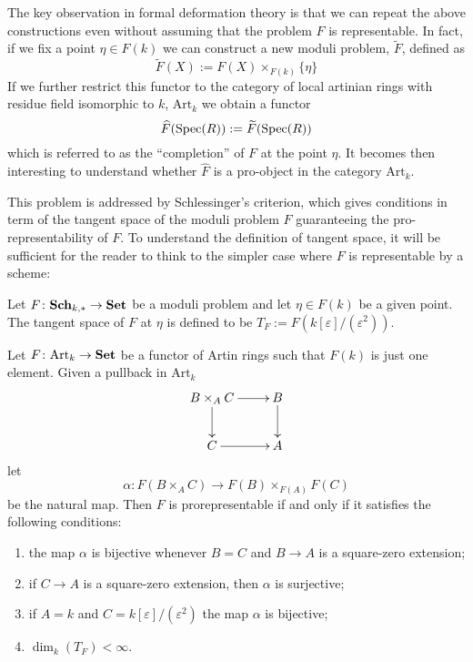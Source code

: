 \begin{refsection}
The key observation in formal deformation theory is that we can repeat the above constructions even without assuming that the problem $F$ is representable. In fact, if we fix a point $\eta \in F(k)$ we can construct a new moduli problem, $\widetilde{F}$, defined as
\[
\widetilde{F}(X) := F(X) \times_{F(k)} \{\eta\}
\]
If we further restrict this functor to the category of local artinian rings with residue field isomorphic to $k$, $\mathrm{Art}_k$ we obtain a functor
\[
\widehat{F}(\mathrm{Spec}(R)) := \widetilde{F}(\mathrm{Spec}(R))
\]
which is referred to as the ``completion'' of $F$ at the point $\eta$. It becomes then interesting to understand whether $\widehat{F}$ is a pro-object in the category $\mathrm{Art}_k$.

This problem is addressed by Schlessinger's criterion, which gives conditions in term of the tangent space of the moduli problem $F$ guaranteeing the pro-representability of $F$. To understand the definition of tangent space, it will be sufficient for the reader to think to the simpler case where $F$ is representable by a scheme:

\begin{defin}
Let $F \colon \mathbf{Sch}_{k,*} \to \mathbf{Set}$ be a moduli problem and let $\eta \in F(k)$ be a given point. The tangent space of $F$ at $\eta$ is defined to be $T_F := F(k[\varepsilon]/(\varepsilon^2))$.
\end{defin}

\begin{thm}[Schlessinger] \label{thm schlessinger}
Let $F \colon \mathrm{Art}_k \to \mathbf{Set}$ be a functor of Artin rings such that $F(k)$ is just one element. Given a pullback in $\mathrm{Art}_k$
\[
\xymatrix{
B \times_A C \ar[r] \ar[d] & B \ar[d] \\ C \ar[r] & A
}
\]
let
\[
\alpha \colon F(B \times_A C) \to F(B) \times_{F(A)} F(C)
\]
be the natural map. Then $F$ is prorepresentable if and only if it satisfies the following conditions:
\begin{enumerate}
\item the map $\alpha$ is bijective whenever $B = C$ and $B \to A$ is a square-zero extension;
\item if $C \to A$ is a square-zero extension, then $\alpha$ is surjective;
\item if $A = k$ and $C = k[\varepsilon]/(\varepsilon^2)$ the map $\alpha$ is bijective;
\item $\dim_k (T_F) < \infty$.
\end{enumerate}
\end{thm}


\end{refsection}

